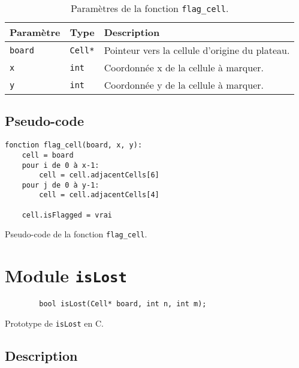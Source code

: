 \begin{table}[!htpb]
    \label{tab:parameters-flag_cell}
    \begin{tabularx}{\textwidth}{lXX}
        \toprule
        \textbf{Paramètre} & \textbf{Type} & \textbf{Description} \\
        \midrule
        \texttt{board} & \texttt{Cell*} & Pointeur vers la cellule d'origine du plateau. \\
        \texttt{x} & \texttt{int} & Coordonnée x de la cellule à marquer. \\
        \texttt{y} & \texttt{int} & Coordonnée y de la cellule à marquer. \\
        \bottomrule
    \end{tabularx}
    \caption{Paramètres de la fonction \texttt{flag\_cell}.}
\end{table}

\subsection{Pseudo-code}

\begin{listing}[!htpb]
    \begin{verbatim}
fonction flag_cell(board, x, y):
    cell = board
    pour i de 0 à x-1:
        cell = cell.adjacentCells[6]
    pour j de 0 à y-1:
        cell = cell.adjacentCells[4]

    cell.isFlagged = vrai
    \end{verbatim}
    \caption{Pseudo-code de la fonction \texttt{flag\_cell}.}
\end{listing}

\newpage

\section{Module \texttt{isLost}}

\begin{listing}[!htpb]
    \begin{verbatim}
        bool isLost(Cell* board, int n, int m);
    \end{verbatim}
    \caption{Prototype de \texttt{isLost} en C.}
    \label{listing:c-isLost-prototype}
\end{listing}

\subsection{Description}

